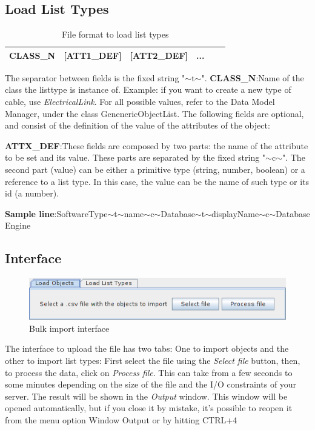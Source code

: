 \documentclass[a4paper]{article}
\begin{document}
			\subsection{Load List Types}\label{sec:bi_load_list_types}	
				\begin{table}[!h]
					\centering
					\begin{tabular}{|l|l|l|l|l|l|}
						\hline
						CLASS\_N& [ATT1\_DEF] & [ATT2\_DEF] & ...  \\ \hline
					\end{tabular}
					\caption{File format to load list types}
					\label{tab:file_format_list_types}
				\end{table}
				The separator between fields is the fixed string "$\sim$t$\sim$".	
				\textbf{CLASS\_N}:Name of the class the listtype is instance of. Example: if you want to create a new type of cable, use \textit{ElectricalLink}. For all possible values, refer to the Data Model Manager, under the class GenenericObjectList.
				\newline
				The following fields are optional, and consist of the definition of the value of the attributes 
				of the object:
				
	  			\textbf{ATTX\_DEF}:These fields are composed by two parts: the name of the attribute to be set and its value. These parts are separated by the fixed string "$\sim$c$\sim$". The second part (value) can be either a primitive type (string, number, boolean) or a reference to a list type. In this case, the value can be the name of such type or its id (a number). 

	  			\textbf{Sample line}:SoftwareType$\sim$t$\sim$name$\sim$c$\sim$Database$\sim$t$\sim$displayName$\sim$c$\sim$Database Engine

			\subsection{Interface}\label{sec:bi_interface}
			
				\begin{figure}[h!]
					\centering
					\includegraphics[width=0.7\linewidth]{img/bulk_import_main_window.png}
					\caption{Bulk import interface}
					\label{fig:bulk_import_interface}
				\end{figure}					
				The interface to upload the file has two tabs: One to import objects and the other to import list types:
				First select the file using the  \textit{Select file} button, then, to process the data, click on \textit{Process file}. This can take from a few seconds to some minutes depending on the size of the file and the I/O constraints of your server. The result will be shown in the \textit{Output} window. This window will be opened automatically, but if you close it by mistake, it’s possible to reopen it from the menu option Window Output or by hitting CTRL+4
\end{document}
